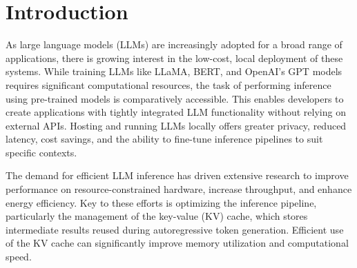 \documentclass[12pt,twoside]{report}
\begin{document}



\clearpage{\pagestyle{empty}\cleardoublepage}
\setcounter{page}{1}
\pagestyle{fancy}

\begin{comment}
\begin{abstract}
Your abstract.
\end{abstract}
\end{comment}

\cleardoublepage
\begin{comment}
\section*{Acknowledgments}
Comment this out if not needed.

\end{comment}

\tableofcontents 


\setcounter{page}{1}
\fancyhead[LE,RO]{\slshape \rightmark}
\fancyhead[LO,RE]{\slshape \leftmark}

\chapter{Introduction} %
As large language models (LLMs) are increasingly adopted for a broad range of applications, there is growing interest in the low-cost, local deployment of these systems. 
While training LLMs like LLaMA, BERT, and OpenAI’s GPT models requires significant computational resources, the task of performing inference using pre-trained models is comparatively accessible. 
This enables developers to create applications with tightly integrated LLM functionality without relying on external APIs. 
Hosting and running LLMs locally offers greater privacy, reduced latency, cost savings, and the ability to fine-tune inference pipelines to suit specific contexts.

The demand for efficient LLM inference has driven extensive research to improve performance on resource-constrained hardware, increase throughput, and enhance energy efficiency. 
Key to these efforts is optimizing the inference pipeline, particularly the management of the key-value (KV) cache, which stores intermediate results reused during autoregressive token generation. 
Efficient use of the KV cache can significantly improve memory utilization and computational speed.
\end{document}

